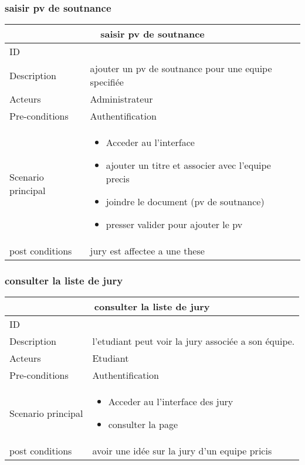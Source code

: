 \documentclass[11pt,fleqn]{book} %
\begin{document}
\subsubsection{saisir pv de soutnance}
\begin{center}
\begin{tabularx}{1\textwidth} { | p{4cm} | >{\raggedright\arraybackslash}X |  }
  \hline
  \multicolumn{2}{|c|}{saisir pv de soutnance} \\
 \hline
 ID & 4  \\
 \hline
 Description  & ajouter un pv de soutnance pour une equipe specifiée   \\
  \hline
 Acteurs  & Administrateur   \\
  \hline
 Pre-conditions  & Authentification\\
 \hline
 Scenario principal  &  
 \begin{itemize}
     \item  Acceder au l'interface 
     \item ajouter un titre et associer avec l'equipe precis
     \item joindre le document (pv de soutnance)
     \item presser valider pour ajouter le pv

 \end{itemize}\\
  \hline
 post conditions  & jury est affectee a une these \\
  \hline
\end{tabularx}
\label{tbl:nicetablelesstable}
\end{center}
\subsubsection{consulter la liste de jury}
\begin{center}
\begin{tabularx}{1\textwidth} { | p{4cm} | >{\raggedright\arraybackslash}X |  }
  \hline
  \multicolumn{2}{|c|}{consulter la liste de jury} \\
 \hline
 ID & 5  \\
 \hline
 Description  &  l'etudiant peut voir la jury associée a son équipe.  \\
  \hline
 Acteurs  & Etudiant\\
  \hline
 Pre-conditions  & Authentification\\
 \hline
 Scenario principal  &  
 \begin{itemize}
     \item  Acceder au l'interface des jury 
     \item consulter la page
 \end{itemize}\\
  \hline
 post conditions  & avoir une idée sur la jury d'un equipe pricis \\
  \hline
\end{tabularx}
\label{tbl:nicetablelesstable}
\end{center}
\end{document}
